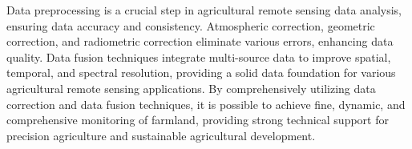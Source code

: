 Data preprocessing is a crucial step in agricultural remote sensing data analysis, ensuring data accuracy and consistency. Atmospheric correction, geometric correction, and radiometric correction eliminate various errors, enhancing data quality. Data fusion techniques integrate multi-source data to improve spatial, temporal, and spectral resolution, providing a solid data foundation for various agricultural remote sensing applications. By comprehensively utilizing data correction and data fusion techniques, it is possible to achieve fine, dynamic, and comprehensive monitoring of farmland, providing strong technical support for precision agriculture and sustainable agricultural development.